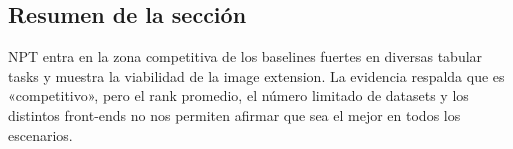 \subsection{Resumen de la sección}

NPT entra en la zona competitiva de los baselines fuertes en diversas tabular tasks y muestra la viabilidad de la image extension. La evidencia respalda que es «competitivo», pero el rank promedio, el número limitado de datasets y los distintos front-ends no nos permiten afirmar que sea el mejor en todos los escenarios.
